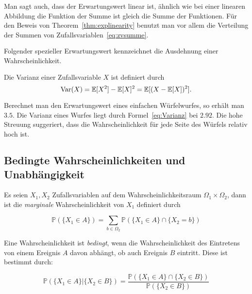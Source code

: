 Man sagt auch, dass der Erwartungswert linear ist, \"ahnlich wie bei einer linearen Abbildung die Funktion der Summe ist gleich die Summe der Funktionen. F\"ur den Beweis von Theorem~\ref{thm:explinearity} benutzt man vor allem die Verteilung der Summen von Zufallsvariablen~\eqref{eq:zvsumme}.

Folgender spezieller Erwartungswert kennzeichnet die Ausdehnung einer Wahrscheinlichkeit. 
\begin{Def}[Varianz]
Die Varianz einer Zufallsvariable $X$ ist definiert durch
\begin{equation}
\label{eq:Varianz}
\Var(X)= \mathbb{E} [X^2] - \mathbb{E} [X]^2 = \mathbb{E} [ (X - \mathbb{E} [X] )^2 ].
\end{equation}

\end{Def}

Berechnet man den Erwartungswert eines einfachen W\"urfelwurfes, so erh\"alt man $3.5$. Die Varianz eines Wurfes liegt durch Formel~\eqref{eq:Varianz} bei $2.92$. Die hohe Streuung suggeriert, dass die Wahrscheinlichkeit f\"ur jede Seite des W\"urfels relativ hoch ist.

\subsection{Bedingte Wahrscheinlichkeiten und Unabh\"angigkeit}

\begin{Def}
\label{def:Wkeits}
Es seien $X_{1}, X_{2}$ Zufallsvariablen auf dem Wahrscheinlichkeitsraum $\Omega_{1}\times \Omega_{2}$, dann ist die \emph{marginale} Wahrscheinlichkeit von $X_{1}$ definiert durch 

\begin{equation*}
\mathbb{P} (\{X_{1} \in A \} ) = \sum_{b \in \Omega_{2} } \mathbb{P} (\{X_{1} \in A\} \cap \{X_{2} = b\})
\end{equation*}

Eine Wahrscheinlichkeit ist \emph{bedingt}, wenn die Wahrscheinlichkeit des Eintretens von einem Ereignis $A$ davon abhängt, ob auch Ereignis $B$ eintritt. 
Diese ist bestimmt durch:

\begin{equation*}
\mathbb{P} (\{X_{1} \in A \} | \{ X_{2} \in B \} ) = \frac {\mathbb{P} ( \{X_{1} \in A \} \cap \{X_{2} \in B \})} {\mathbb{P} (\{X_{2} \in B\})}
\end{equation*}
\end{Def}

